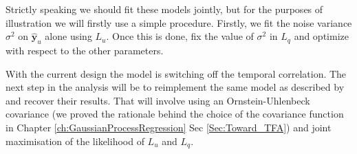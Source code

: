 Strictly speaking we should fit these models jointly, but for the purposes of illustration we will firstly use a simple procedure. Firstly, we fit the noise variance $\sigma^2$ on $\hat{\mathbf{y}}_u$ alone using $L_u$. Once this is done, fix the value of $\sigma^2$ in $L_q$ and optimize with respect to the other parameters.

With the current design the model is switching off the temporal correlation. The next step in the analysis will be to reimplement the same model as described by \cite{Sanguinetti:2006} and recover their results. That will involve using an Ornstein-Uhlenbeck covariance (we proved the rationale behind the choice of the covariance function in Chapter \ref{ch:GaussianProcessRegression} Sec \ref{Sec:Toward_TFA}) and joint maximisation of the likelihood of $L_u$ and $L_q$.

